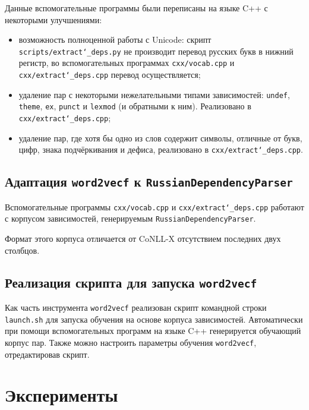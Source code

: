 \documentclass[oneside,senior,etd]{BYUPhys}
\begin{document}
Данные вспомогательные программы были переписаны на языке C++ с некоторыми улучшениями:
\begin{itemize}
        \item
        возможность полноценной работы с Unicode: скрипт \texttt{scripts/extract\char`_deps.py} не производит перевод русских букв в нижний регистр, во вспомогательных программах \texttt{cxx/vocab.cpp} и \texttt{cxx/extract\char`_deps.cpp} перевод осуществляется;
        \item
        удаление пар с некоторыми нежелательными типами зависимостей: \texttt{undef}, \texttt{theme}, \texttt{ex}, \texttt{punct} и \texttt{lexmod} (и обратными к ним). Реализовано в \texttt{cxx/extract\char`_deps.cpp};
        \item
        удаление пар, где хотя бы одно из слов содержит символы, отличные от букв, цифр, знака подчёркивания и дефиса, реализовано в \texttt{cxx/extract\char`_deps.cpp}.
\end{itemize}

\subsection{Адаптация \texttt{word2vecf} к \texttt{RussianDependencyParser}}

Вспомогательные программы \texttt{cxx/vocab.cpp} и \texttt{cxx/extract\char`_deps.cpp} работают с корпусом зависимостей, генерируемым \texttt{RussianDependencyParser}.

Формат этого корпуса отличается от CoNLL-X отсутствием последних двух столбцов.

\subsection{Реализация скрипта для запуска \texttt{word2vecf}}

Как часть инструмента \texttt{word2vecf} реализован скрипт командной строки \texttt{launch.sh} для запуска обучения на основе корпуса зависимостей. Автоматически при помощи вспомогательных программ на языке C++ генерируется обучающий корпус пар. Также можно настроить параметры обучения \texttt{word2vecf}, отредактировав скрипт.



\section{Эксперименты}
\label{sec:Chapter4} 
\end{document}
